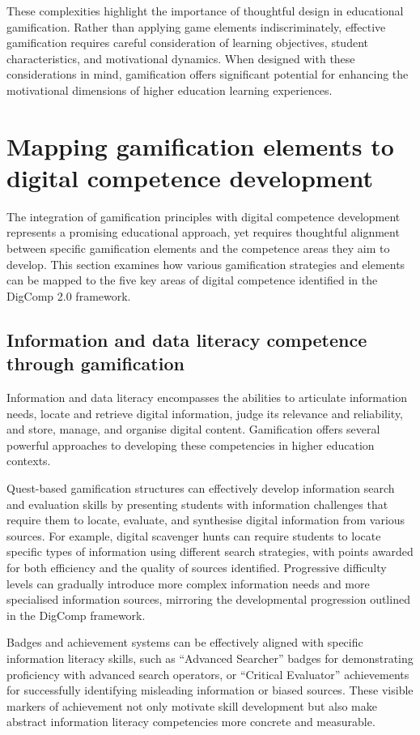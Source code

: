 \documentclass[cte]{acnsart}
\begin{document}
These complexities highlight the importance of thoughtful design in educational gamification. Rather than applying game elements indiscriminately, effective gamification requires careful consideration of learning objectives, student characteristics, and motivational dynamics. When designed with these considerations in mind, gamification offers significant potential for enhancing the motivational dimensions of higher education learning experiences.

\section{Mapping gamification elements to digital competence development\label{sec3}}

The integration of gamification principles with digital competence development represents a promising educational approach, yet requires thoughtful alignment between specific gamification elements and the competence areas they aim to develop. This section examines how various gamification strategies and elements can be mapped to the five key areas of digital competence identified in the DigComp 2.0 framework.

\subsection{Information and data literacy competence through gamification}

Information and data literacy encompasses the abilities to articulate information needs, locate and retrieve digital information, judge its relevance and reliability, and store, manage, and organise digital content. Gamification offers several powerful approaches to developing these competencies in higher education contexts.

Quest-based gamification structures can effectively develop information search and evaluation skills by presenting students with information challenges that require them to locate, evaluate, and synthesise digital information from various sources. For example, digital scavenger hunts can require students to locate specific types of information using different search strategies, with points awarded for both efficiency and the quality of sources identified. Progressive difficulty levels can gradually introduce more complex information needs and more specialised information sources, mirroring the developmental progression outlined in the DigComp framework.

Badges and achievement systems can be effectively aligned with specific information literacy skills, such as ``Advanced Searcher'' badges for demonstrating proficiency with advanced search operators, or ``Critical Evaluator'' achievements for successfully identifying misleading information or biased sources. These visible markers of achievement not only motivate skill development but also make abstract information literacy competencies more concrete and measurable.
\end{document}
